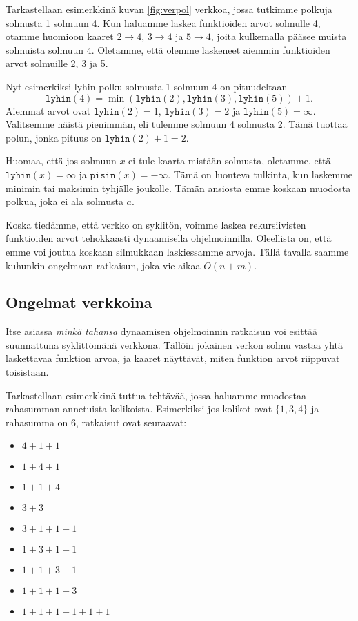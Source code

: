 Tarkastellaan esimerkkinä kuvan \ref{fig:verpol} verkkoa,
jossa tutkimme polkuja solmusta 1 solmuun 4.
Kun haluamme laskea funktioiden arvot solmulle 4,
otamme huomioon kaaret
$2 \rightarrow 4$, $3 \rightarrow 4$ ja $5 \rightarrow 4$,
joita kulkemalla pääsee muista solmuista solmuun 4.
Oletamme, että olemme laskeneet aiemmin funktioiden
arvot solmuille 2, 3 ja 5.

Nyt esimerkiksi lyhin polku solmusta 1 solmuun 4 on pituudeltaan
\[ \texttt{lyhin}(4)=\min(\texttt{lyhin}(2),\texttt{lyhin}(3),\texttt{lyhin}(5))+1.\]
Aiemmat arvot ovat $\texttt{lyhin}(2)=1$, $\texttt{lyhin}(3)=2$ ja $\texttt{lyhin}(5)=\infty$.
Valitsemme näistä pienimmän, eli tulemme solmuun 4 solmusta 2.
Tämä tuottaa polun, jonka pituus on $\texttt{lyhin}(2)+1=2$.

Huomaa, että jos solmuun $x$ ei tule kaarta mistään solmusta,
oletamme, että $\texttt{lyhin}(x)=\infty$ ja $\texttt{pisin}(x)=-\infty$.
Tämä on luonteva tulkinta, kun laskemme minimin tai maksimin
tyhjälle joukolle.
Tämän ansiosta emme koskaan muodosta polkua,
joka ei ala solmusta $a$.

Koska tiedämme, että verkko on syklitön,
voimme laskea rekursiivisten funktioiden arvot
tehokkaasti dynaamisella ohjelmoinnilla.
Oleellista on, että emme voi joutua koskaan silmukkaan
laskiessamme arvoja.
Tällä tavalla saamme kuhunkin ongelmaan ratkaisun, joka
vie aikaa $O(n+m)$.

\subsection{Ongelmat verkkoina}

Itse asiassa \emph{minkä tahansa} dynaamisen ohjelmoinnin ratkaisun voi
esittää suunnattuna syklittömänä verkkona.
Tällöin jokainen verkon solmu vastaa yhtä laskettavaa funktion arvoa,
ja kaaret näyttävät, miten funktion arvot riippuvat toisistaan.

Tarkastellaan esimerkkinä tuttua tehtävää,
jossa haluamme muodostaa rahasumman annetuista kolikoista.
Esimerkiksi jos kolikot ovat $\{1,3,4\}$ ja rahasumma on 6,
ratkaisut ovat seuraavat:

\begin{multicols}{2}
\begin{itemize}
\item $4+1+1$
\item $1+4+1$
\item $1+1+4$
\item $3+3$
\item $3+1+1+1$
\item $1+3+1+1$
\item $1+1+3+1$
\item $1+1+1+3$
\item $1+1+1+1+1+1$
\end{itemize}
\end{multicols}

